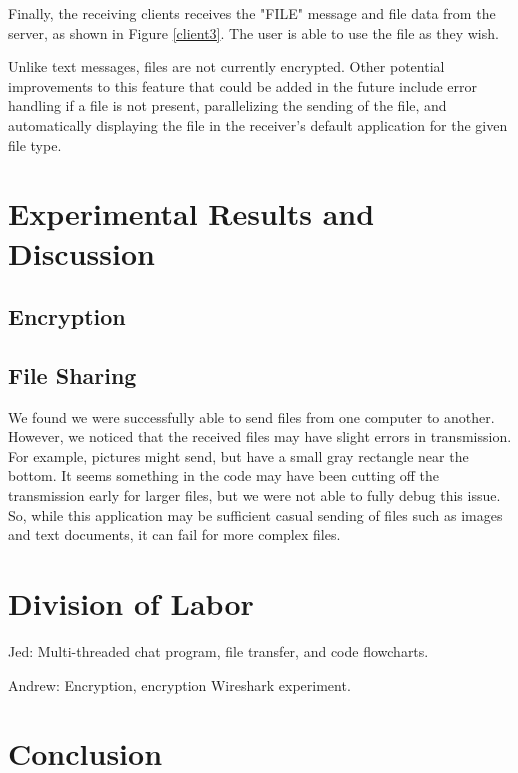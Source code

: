 \documentclass{article}
\begin{document}
Finally, the receiving clients receives the "FILE" message and file data from the server, as shown in Figure \ref{client3}. The user is able to use the file as they wish.

Unlike text messages, files are not currently encrypted. Other potential improvements to this feature that could be added in the future include error handling if a file is not present, parallelizing the sending of the file, and automatically displaying the file in the receiver's default application for the given file type.

\section{Experimental Results and Discussion}

\subsection{Encryption}

\subsection{File Sharing}
We found we were successfully able to send files from one computer to another. However, we noticed that the received files may have slight errors in transmission. For example, pictures might send, but have a small gray rectangle near the bottom. It seems something in the code may have been cutting off the transmission early for larger files, but we were not able to fully debug this issue. So, while this application may be sufficient casual sending of files such as images and text documents, it can fail for more complex files.


\section{Division of Labor}

Jed: Multi-threaded chat program, file transfer, and code flowcharts. 

Andrew: Encryption, encryption Wireshark experiment. 

\section{Conclusion}
\end{document}

